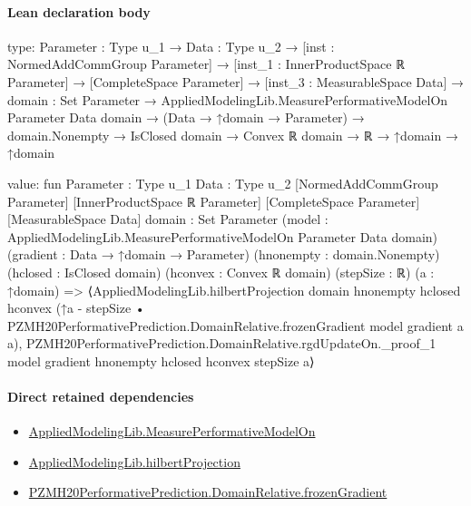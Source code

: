 \documentclass[10pt]{article}
\begin{document}
\paragraph{Lean declaration body}
\begin{ReviewVerbatim}
type:
{Parameter : Type u_1} →
  {Data : Type u_2} →
    [inst : NormedAddCommGroup Parameter] →
      [inst_1 : InnerProductSpace ℝ Parameter] →
        [CompleteSpace Parameter] →
          [inst_3 : MeasurableSpace Data] →
            {domain : Set Parameter} →
              AppliedModelingLib.MeasurePerformativeModelOn Parameter Data domain →
                (Data → ↑domain → Parameter) →
                  domain.Nonempty → IsClosed domain → Convex ℝ domain → ℝ → ↑domain → ↑domain

value:
fun {Parameter : Type u_1} {Data : Type u_2} [NormedAddCommGroup Parameter] [InnerProductSpace ℝ Parameter]
    [CompleteSpace Parameter] [MeasurableSpace Data] {domain : Set Parameter}
    (model : AppliedModelingLib.MeasurePerformativeModelOn Parameter Data domain)
    (gradient : Data → ↑domain → Parameter) (hnonempty : domain.Nonempty) (hclosed : IsClosed domain)
    (hconvex : Convex ℝ domain) (stepSize : ℝ) (a : ↑domain) =>
  ⟨AppliedModelingLib.hilbertProjection domain hnonempty hclosed hconvex
      (↑a - stepSize • PZMH20PerformativePrediction.DomainRelative.frozenGradient model gradient a a),
    PZMH20PerformativePrediction.DomainRelative.rgdUpdateOn._proof_1 model gradient hnonempty hclosed hconvex stepSize
      a⟩
\end{ReviewVerbatim}

\paragraph{Direct retained dependencies}
\begin{itemize}\raggedright
\item \hyperlink{library-prerequisite-e14cc5e8b1e1460e}{Applied\allowbreak{}Modeling\allowbreak{}Lib.\allowbreak{}Measure\allowbreak{}Performative\allowbreak{}Model\allowbreak{}On}
\item \hyperlink{governing-declaration-4754f89c36035dea}{Applied\allowbreak{}Modeling\allowbreak{}Lib.\allowbreak{}hilbert\allowbreak{}Projection}
\item \hyperlink{governing-declaration-f412c545c8eeac28}{PZMH20\allowbreak{}Performative\allowbreak{}Prediction.\allowbreak{}Domain\allowbreak{}Relative.\allowbreak{}frozen\allowbreak{}Gradient}
\end{itemize}
\hypertarget{governing-declaration-9a55381aedc8eead}{}
\end{document}
